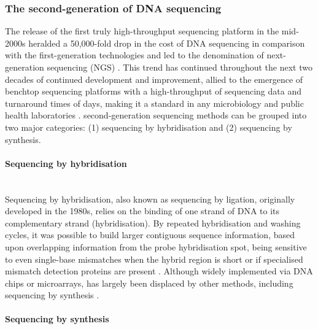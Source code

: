 \subsubsection{The second-generation of DNA sequencing} \label{ssec:2nd_gen_seq}

The release of the first truly high-throughput sequencing platform in the mid-2000s heralded a 50,000-fold drop in the cost of DNA sequencing in comparison with the first-generation technologies and led to the denomination of next-generation sequencing (NGS) \citep{goodwin_coming_2016}. This trend has continued throughout the next two decades of continued development and improvement, allied to the emergence of benchtop sequencing platforms with a high-throughput of sequencing data and turnaround times of days, making it a standard in any microbiology and public health laboratories \citep{loman_twenty_2015}. second-generation sequencing methods can be grouped into two major categories: (1) sequencing by hybridisation and (2) sequencing by synthesis. 

\paragraph{Sequencing by hybridisation} \label{sssec:2nd_gen_seq_hybrid} \mbox{}\\

Sequencing by hybridisation, also known as sequencing by ligation, originally developed in the 1980s, relies on the binding of one strand of DNA to its complementary strand (hybridisation). By repeated hybridisation and washing cycles, it was possible to build larger contiguous sequence information, based upon overlapping information from the probe hybridisation spot, being sensitive to even single-base mismatches when the hybrid region is short or if specialised mismatch detection proteins are present \citep{slatko_overview_2018, detter_nucleic_2014}. Although widely implemented via DNA chips or microarrays, has largely been displaced by other methods, including sequencing by synthesis \citep{goodwin_coming_2016}. 

\paragraph{Sequencing by synthesis} \label{sssec:2nd_gen_seq_synth} \mbox{}\\

